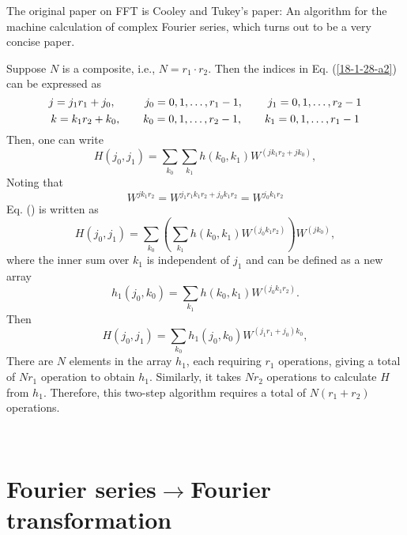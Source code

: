 \documentclass{article}
\begin{document}
The original paper on FFT is Cooley and Tukey's paper: An algorithm for the
machine calculation of complex Fourier series, which turns out to be a very
concise paper.

Suppose $N$ is a composite, i.e., $N = r_1 \cdot r_2$. Then the indices in Eq.
(\ref{18-1-28-a2}) can be expressed as
\begin{equation}
  j = j_1 r_1 + j_0, \hspace{2.6em} j_0 = 0, 1, \ldots, r_1 - 1,
  \hspace{2.2em} j_1 = 0, 1, \ldots, r_2 - 1
\end{equation}
\begin{equation}
  k = k_1 r_2 + k_0, \hspace{2.0em} k_0 = 0, 1, \ldots, r_2 - 1,
  \hspace{2.0em} k_1 = 0, 1, \ldots, r_1 - 1
\end{equation}
Then, one can write
\begin{equation}
  H (j_0, j_1) = \sum_{k_0} \sum_{k_1} h (k_0, k_1) W^{(j k_1 r_2 + j k_0)},
\end{equation}
Noting that
\begin{equation}
  W^{j k_1 r_2} = W^{j_1 r_1 k_1 r_2 + j_0 k_1 r_2} = W^{j_0 k_1 r_2}
\end{equation}
Eq. () is written as
\begin{equation}
  H (j_0, j_1) = \sum_{k_0} \left( \sum_{k_1} h (k_0, k_1) W^{(j_0 k_1 r_2)}
  \right) W^{(j k_0)},
\end{equation}
where the inner sum over $k_1$ is independent of $j_1$ and can be defined as a
new array
\begin{equation}
  h_1 (j_0, k_0) = \sum_{k_1} h (k_0, k_1) W^{(j_0 k_1 r_2)} .
\end{equation}
Then
\begin{equation}
  H (j_0, j_1) = \sum_{k_0} h_1 (j_0, k_0) W^{(j_1 r_1 + j_0) k_0},
\end{equation}
There are $N$ elements in the array $h_1$, each requiring $r_1$ operations,
giving a total of $N r_1$ operation to obtain $h_1$. Similarly, it takes $N
r_2$ operations to calculate $H$ from $h_1$. Therefore, this two-step
algorithm requires a total of $N (r_1 + r_2)$ operations.

\

\section{Fourier series$\rightarrow$Fourier transformation}\label{23-10-17-1}
\end{document}
